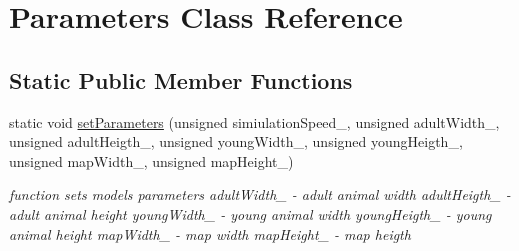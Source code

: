 \hypertarget{class_parameters}{}\section{Parameters Class Reference}
\label{class_parameters}
\subsection*{Static Public Member Functions}
\begin{DoxyCompactItemize}
\item 
static void \hyperlink{class_parameters_a6d84a2dc3c36144dc054a8516fce43cc}{set\+Parameters} (unsigned simiulation\+Speed\+\_\+, unsigned adult\+Width\+\_\+, unsigned adult\+Heigth\+\_\+, unsigned young\+Width\+\_\+, unsigned young\+Heigth\+\_\+, unsigned map\+Width\+\_\+, unsigned map\+Height\+\_\+)
\begin{DoxyCompactList}\small\item\em function sets model\textquotesingle{}s parameters  adult\+Width\+\_\+ -\/ adult animal width  adult\+Heigth\+\_\+ -\/ adult animal height  young\+Width\+\_\+ -\/ young animal width  young\+Heigth\+\_\+ -\/ young animal height  map\+Width\+\_\+ -\/ map width  map\+Height\+\_\+ -\/ map heigth \end{DoxyCompactList}\end{DoxyCompactItemize}
